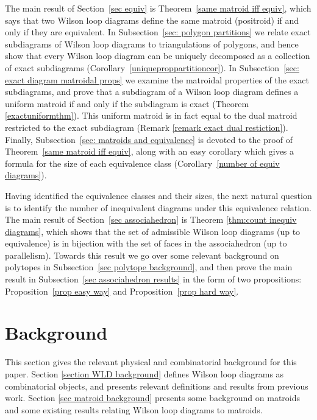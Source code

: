\documentclass[11pt]{article}
\theoremstyle{remark}
\theoremstyle{definition}
\begin{document}
The main result of Section~\ref{sec equiv} is Theorem~\ref{same matroid iff equiv}, which says that two Wilson loop diagrams define the same matroid (positroid) if and only if they are equivalent.  In Subsection~\ref{sec: polygon partitions} we relate exact subdiagrams of Wilson loop diagrams to triangulations of polygons, and hence show that every Wilson loop diagram can be uniquely decomposed as a collection of exact subdiagrams (Corollary~\ref{uniqueproppartitioncor}). In Subsection~\ref{sec: exact diagram matroidal props} we examine the matroidal properties of the exact subdiagrams, and prove that a subdiagram of a Wilson loop diagram defines a uniform matroid if and only if the subdiagram is exact (Theorem \ref{exactuniformthm}). This uniform matroid is in fact equal to the dual matroid restricted to the exact subdiagram (Remark \ref{remark exact dual restiction}).  Finally, Subsection~\ref{sec: matroids and equivalence} is devoted to the proof of Theorem~\ref{same matroid iff equiv}, along with an easy corollary which gives a formula for the size of each equivalence class (Corollary~\ref{number of equiv diagrams}).

Having identified the equivalence classes and their sizes, the next natural question is to identify the number of inequivalent diagrams under this equivalence relation.  The main result of Section~\ref{sec associahedron} is Theorem \ref{thm:count inequiv diagrams}, which shows that the set of admissible Wilson loop diagrams (up to equivalence) is in bijection with the set of faces in the associahedron (up to parallelism).  Towards this result we go over some relevant background on polytopes in Subsection~\ref{sec polytope background}, and then prove the main result in Subsection~\ref{sec associahedron results} in the form of two propositions: Proposition~\ref{prop easy way} and Proposition~\ref{prop hard way}.

\section{Background}\label{section overall background}

This section gives the relevant physical and combinatorial background for this paper. Section \ref{section WLD background} defines Wilson loop diagrams as combinatorial objects, and presents relevant definitions and results from previous work. Section \ref{sec matroid background} presents some background on matroids and some existing results relating Wilson loop diagrams to matroids. 
\end{document}
